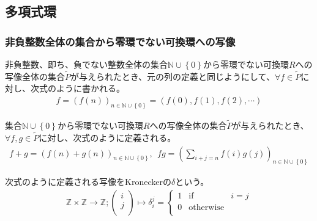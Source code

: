 \documentclass[dvipdfmx]{jsarticle}
\begin{document}
\subsection{多項式環}%
\subsubsection{非負整数全体の集合から零環でない可換環への写像}%
\begin{dfn}
非負整数、即ち、負でない整数全体の集合$\mathbb{N} \cup \left\{ 0 \right\}$から零環でない可換環$R$への写像全体の集合$\widetilde{P}$が与えられたとき、元の列の定義と同じようにして、$\forall f \in \widetilde{P}$に対し、次式のように書かれる。
\begin{align*}
f = \left( f(n) \right)_{n \in \mathbb{N} \cup \left\{ 0 \right\}} = \left( f(0),f(1),f(2),\cdots \right)
\end{align*}
\end{dfn}
\begin{dfn}
集合$\mathbb{N} \cup \left\{ 0 \right\}$から零環でない可換環$R$への写像全体の集合$\widetilde{P}$が与えられたとき、$\forall f,g \in \widetilde{P}$に対し、次式のように定義される。
\begin{align*}
f + g = \left( f(n) + g(n) \right)_{n \in \mathbb{N} \cup \left\{ 0 \right\}},\ \ fg = \left( \sum_{i + j = n} {f(i)g(j)} \right)_{n \in \mathbb{N} \cup \left\{ 0 \right\}}
\end{align*}
\end{dfn}
\begin{dfn}
次式のように定義される写像をKroneckerの$\delta $という。
\begin{align*}
\mathbb{Z}\times \mathbb{Z} \rightarrow \mathbb{Z} ; \begin{pmatrix}
  i\\
  j\\
\end{pmatrix} \mapsto \delta_{i}^{j} =\left\{ \begin{matrix}
  1 & \mathrm{if} & i = j \\
  0 & \mathrm{otherwise} & \\
\end{matrix} \right. 
\end{align*}
\end{dfn}
\end{document}
